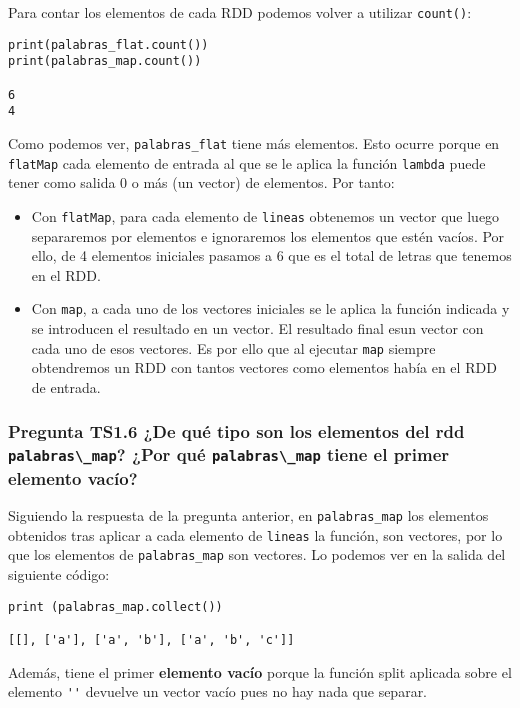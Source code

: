 \documentclass[11pt]{article}
\def\inline{\lstinline[basicstyle=\ttfamily,keywordstyle={}]}
\begin{document}
Para contar los elementos de cada RDD podemos volver a utilizar \inline{count()}:

\begin{verbatim}
print(palabras_flat.count())
print(palabras_map.count())

6
4
\end{verbatim}

Como podemos ver, \inline{palabras_flat} tiene más elementos. Esto ocurre porque en \inline{flatMap} cada elemento de entrada al que se le aplica la función \inline{lambda} puede tener como salida 0 o más (un vector) de elementos. Por tanto:

\begin{itemize}
	\item Con \inline{flatMap}, para cada elemento de \inline{lineas} obtenemos un vector que luego separaremos por elementos e ignoraremos los elementos que estén vacíos. Por ello, de 4 elementos iniciales pasamos a 6 que es el total de letras que tenemos en el RDD.
	
	\item Con \inline{map}, a cada uno de los vectores iniciales se le aplica la función indicada y se introducen el resultado en un vector. El resultado final esun vector con cada uno de esos vectores. Es por ello que al ejecutar \inline{map} siempre obtendremos un RDD con tantos vectores como elementos había en el RDD de entrada.
\end{itemize}

\subsubsection*{ Pregunta TS1.6 ¿De qué tipo son los elementos del rdd \inline{palabras\_map}? ¿Por qué \inline{palabras\_map} tiene el primer elemento vacío?}

Siguiendo la respuesta de la pregunta anterior, en \inline{palabras_map} los elementos obtenidos tras aplicar a cada elemento de \inline{lineas} la función, son vectores, por lo que los elementos de \inline{palabras_map} son vectores. Lo podemos ver en la salida del siguiente código:

\begin{verbatim}
print (palabras_map.collect())

[[], ['a'], ['a', 'b'], ['a', 'b', 'c']]
\end{verbatim}

Además, tiene el primer \textbf{elemento vacío} porque la función split aplicada sobre el elemento \inline{''} devuelve un vector vacío pues no hay nada que separar.
\end{document}
